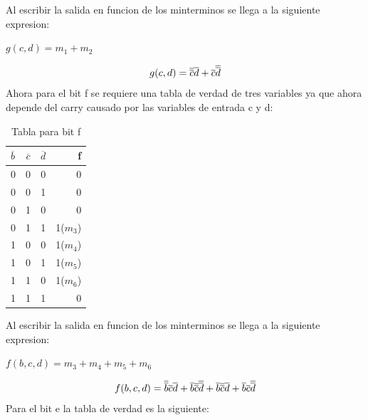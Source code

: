 \documentclass{article}
\begin{document}
		\newline Al escribir la salida en funcion de los minterminos se llega a la siguiente expresion:
		\newline \centerline{$g(c,d)=m_{1}+m_{2}$}
		\begin{equation}
			\centerline{$g(c,d)=\overline{\overline{c}}\overline{d}+\overline{c}\overline{\overline{d}}$}
		\end{equation}
		\newline Ahora para el bit f se requiere una tabla de verdad de tres variables ya que ahora depende del carry causado por las variables de entrada c y d:
		\begin{table}[h!]
			\begin{center}
				\caption{Tabla para bit f}
				\begin{tabular}{l|c|c|r}
				\textbf{$\overline{b}$} & \textbf{$\overline{c}$} & \textbf{$\overline{d}$} & \textbf{f}\\
				\hline
				0 & 0 & 0 & 0\\
				0 & 0 & 1 & 0\\	
				0 & 1 & 0 & 0\\
				0 & 1 & 1 & 1($m_{3}$)\\
				1 & 0 & 0 & 1($m_{4}$)\\
				1 & 0 & 1 & 1($m_{5}$)\\	
				1 & 1 & 0 & 1($m_{6}$)\\
				1 & 1 & 1 & 0\\				
				\end{tabular}
			\end{center}
		\end{table}
		\newline Al escribir la salida en funcion de los minterminos se llega a la siguiente expresion:
		\newline \centerline{$f(b,c,d)=m_{3}+m_{4}+m_{5}+m_{6}$}
		\begin{equation}
			\centerline{$f(b,c,d)=\overline{\overline{b}}\overline{c}\overline{d}+\overline{b}\overline{\overline{c}}\overline{\overline{d}}+\overline{b}\overline{\overline{c}}\overline{d}+\overline{b}\overline{c}\overline{\overline{d}}$}
		\end{equation}
		\newline Para el bit e la tabla de verdad es la siguiente:
\end{document}
